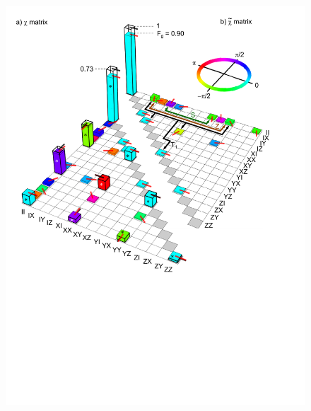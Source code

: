 \begin{figure}
	\centering
		\includegraphics[width=1.\textwidth]{./material/papers/iswap/figures/chi_matrix_and_error_process}
	\label{fig:GateChiMatrixAndErrorProcess}
	\caption{}
\end{figure}

